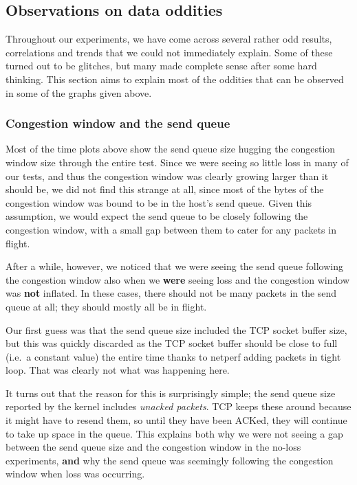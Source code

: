 \documentclass[12pt,a4paper]{article}
\begin{document}
\subsection{Observations on data oddities}
Throughout our experiments, we have come across several rather odd results,
correlations and trends that we could not immediately explain. Some of these
turned out to be glitches, but many made complete sense after some hard
thinking. This section aims to explain most of the oddities that can be observed
in some of the graphs given above.

\subsubsection{Congestion window and the send queue}
Most of the time plots above show the send queue size hugging the congestion
window size through the entire test. Since we were seeing so little loss in many
of our tests, and thus the congestion window was clearly growing larger than it
should be, we did not find this strange at all, since most of the bytes
of the congestion window was bound to be in the host's send queue. Given this
assumption, we would expect the send queue to be closely following the
congestion window, with a small gap between them to cater for any packets in
flight.

After a while, however, we noticed that we were seeing the send queue following
the congestion window also when we \textbf{were} seeing loss and the congestion
window was \textbf{not} inflated. In these cases, there should not be many
packets in the send queue at all; they should mostly all be in flight.

Our first guess was that the send queue size included the TCP socket buffer
size, but this was quickly discarded as the TCP socket buffer should be close to
full (i.e.\ a constant value) the entire time thanks to netperf adding packets
in tight loop. That was clearly not what was happening here.

It turns out that the reason for this is surprisingly simple; the send queue
size reported by the kernel includes \textit{unacked packets}. TCP keeps these
around because it might have to resend them, so until they have been ACKed, they
will continue to take up space in the queue. This explains both why we were not
seeing a gap between the send queue size and the congestion window in the
no-loss experiments, \textbf{and} why the send queue was seemingly following the
congestion window when loss was occurring.
\end{document}
